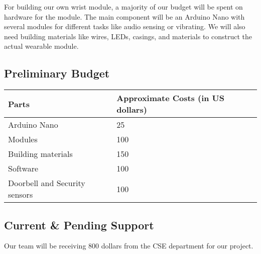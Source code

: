 For building our own wrist module, a majority of our budget will be spent on hardware for the module. The main component will be an Arduino Nano with several modules for different tasks like audio sensing or vibrating. We will also need building materials like wires, LEDs, casings, and materials to construct the actual wearable module.


\subsection{Preliminary Budget}
\begin{table}[h]
\begin{tabular}{|l|l|}
\hline
Parts                         & Approximate Costs (in US dollars) \\ \hline
Arduino Nano                  & 25                \\ \hline
Modules                       & 100               \\ \hline
Building materials            & 150               \\ \hline
Software                      & 100               \\ \hline
Doorbell and Security sensors & 100               \\ \hline
\end{tabular}
\end{table}

\subsection{Current \& Pending Support}
Our team will be receiving 800 dollars from the CSE department for our project.  